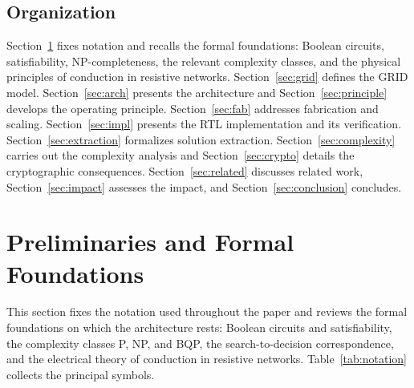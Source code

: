 \documentclass[letterpaper,journal]{IEEEtran}
\begin{document}
\subsection{Organization}
Section~\ref{sec:prelim} fixes notation and recalls the formal foundations:
Boolean circuits, satisfiability, NP-completeness, the relevant complexity
classes, and the physical principles of conduction in resistive networks.
Section~\ref{sec:grid} defines the GRID model.
Section~\ref{sec:arch} presents the architecture and
Section~\ref{sec:principle} develops the operating principle.
Section~\ref{sec:fab} addresses fabrication and scaling.
Section~\ref{sec:impl} presents the RTL implementation and its
verification. Section~\ref{sec:extraction} formalizes solution extraction.
Section~\ref{sec:complexity} carries out the complexity analysis and
Section~\ref{sec:crypto} details the cryptographic consequences.
Section~\ref{sec:related} discusses related work,
Section~\ref{sec:impact} assesses the impact, and
Section~\ref{sec:conclusion} concludes.

\section{Preliminaries and Formal Foundations}
\label{sec:prelim}

This section fixes the notation used throughout the paper and reviews the
formal foundations on which the architecture rests: Boolean circuits and
satisfiability, the complexity classes P, NP, and BQP, the
search-to-decision correspondence, and the electrical theory of conduction
in resistive networks. Table~\ref{tab:notation} collects the principal
symbols.
\end{document}
